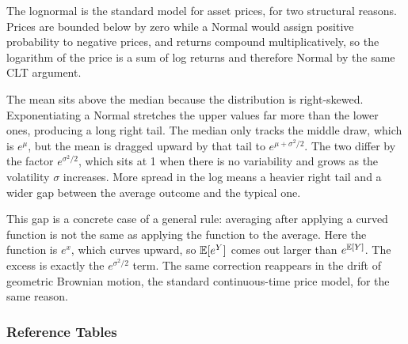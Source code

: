 The lognormal is the standard model for asset prices, for two structural reasons. Prices are bounded below by zero while a Normal would assign positive probability to negative prices, and returns compound multiplicatively, so the logarithm of the price is a sum of log returns and therefore Normal by the same CLT argument.

The mean sits above the median because the distribution is right-skewed. Exponentiating a Normal stretches the upper values far more than the lower ones, producing a long right tail. The median only tracks the middle draw, which is $e^{\mu}$, but the mean is dragged upward by that tail to $e^{\mu + \sigma^2/2}$. The two differ by the factor $e^{\sigma^2/2}$, which sits at 1 when there is no variability and grows as the volatility $\sigma$ increases. More spread in the log means a heavier right tail and a wider gap between the average outcome and the typical one.

This gap is a concrete case of a general rule: averaging after applying a curved function is not the same as applying the function to the average. Here the function is $e^x$, which curves upward, so $\mathbb{E}[e^Y]$ comes out larger than $e^{\mathbb{E}[Y]}$. The excess is exactly the $e^{\sigma^2/2}$ term. The same correction reappears in the drift of geometric Brownian motion, the standard continuous-time price model, for the same reason.

\subsubsection{Reference Tables}


